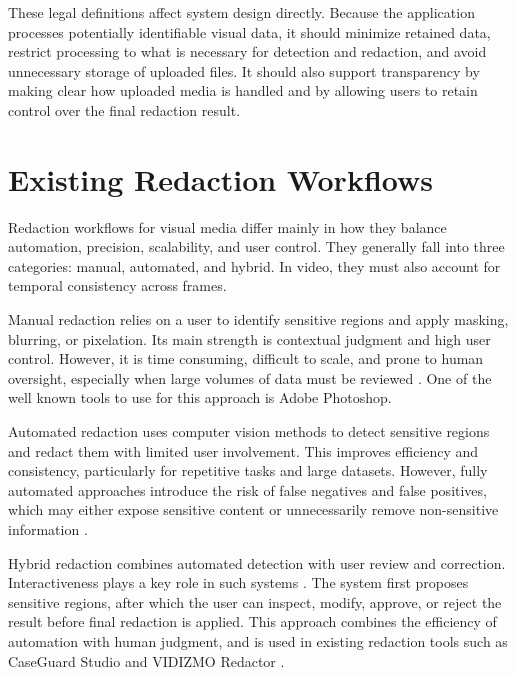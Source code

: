 These legal definitions affect system design directly. Because the application processes potentially identifiable visual data, it should minimize retained data, restrict processing to what is necessary for detection and redaction, and avoid unnecessary storage of uploaded files. It should also support transparency by making clear how uploaded media is handled and by allowing users to retain control over the final redaction result.



\section{Existing Redaction Workflows}

Redaction workflows for visual media differ mainly in how they balance automation, precision, scalability, and user control. They generally fall into three categories: manual, automated, and hybrid. In video, they must also account for temporal consistency across frames.


Manual redaction relies on a user to identify sensitive regions and apply \gls{masking}, blurring, or pixelation. Its main strength is contextual judgment and high user control. However, it is time consuming, difficult to scale, and prone to human oversight, especially when large volumes of data must be reviewed \cite{orekondy2017connecting}. One of the well known tools to use for this approach is Adobe Photoshop.


Automated redaction uses computer vision methods to detect sensitive regions and redact them with limited user involvement. This improves efficiency and consistency, particularly for repetitive tasks and large datasets. However, fully automated approaches introduce the risk of \gls{false negative}s and false positives, which may either expose sensitive content or unnecessarily remove non-sensitive information \cite{zhao2023visual}.

\label{subsec:hybrid_redaction_user_control}

Hybrid redaction combines automated detection with user review and correction. Interactiveness plays a key role in such systems \cite{human_in_loop_ai}. The system first proposes sensitive regions, after which the user can inspect, modify, approve, or reject the result before final redaction is applied. This approach combines the efficiency of automation with human judgment, and is used in existing redaction tools such as CaseGuard Studio and VIDIZMO Redactor \cite{caseguard_redaction, vidizmo_redaction}. 


